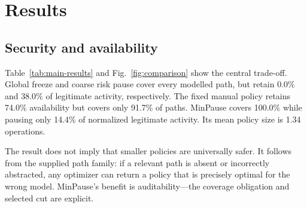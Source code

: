 \documentclass[sn-vancouver,Numbered]{sn-jnl}
\newcommand{\ScenarioCount}{360}
\newcommand{\MinAttackPrevention}{100.0\%}
\newcommand{\MinBlockedVolume}{14.4\%}
\newcommand{\ManualAttackPrevention}{91.7\%}
\newcommand{\MinPolicySize}{1.34}
\begin{document}
\section{Results}
\begin{table}[t]
\centering
\caption{Mean results across \ScenarioCount{} scenarios. Higher is better for attack prevention, availability, and recovery; lower is better for policy size and disparity.}
\label{tab:main-results}
\end{table}

\subsection{Security and availability}
Table~\ref{tab:main-results} and Fig.~\ref{fig:comparison} show the central trade-off.  Global freeze and coarse risk pause cover every modelled path, but retain 0.0\% and 38.0\% of legitimate activity, respectively.  The fixed manual policy retains 74.0\% availability but covers only \ManualAttackPrevention{} of paths.  MinPause covers \MinAttackPrevention{} while pausing only \MinBlockedVolume{} of normalized legitimate activity.  Its mean policy size is \MinPolicySize{} operations.

The result does not imply that smaller policies are universally safer.  It follows from the supplied path family: if a relevant path is absent or incorrectly abstracted, any optimizer can return a policy that is precisely optimal for the wrong model.  MinPause's benefit is auditability---the coverage obligation and selected cut are explicit.
\end{document}
